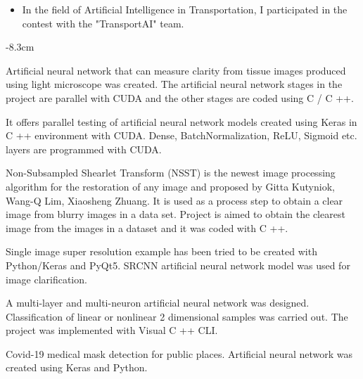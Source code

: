 \documentclass[10pt,a4paper]{altacv}
\begin{document}

\begin{itemize}
    \item In the field of Artificial Intelligence in Transportation, I participated in the contest with the "TransportAI" team.
\end{itemize}

\smallskip


\begin{adjustwidth}{}{-8.3cm}

 {}

Artificial neural network that can measure clarity from tissue images produced using light microscope was created. The artificial neural network stages in the project are parallel with CUDA and the other stages are coded using C / C ++.

\divider

It offers parallel testing of artificial neural network models created using Keras in C ++ environment with CUDA. Dense, BatchNormalization, ReLU, Sigmoid etc. layers are programmed with CUDA.

\divider


Non-Subsampled Shearlet Transform (NSST) is the newest image processing algorithm for the restoration of any image and proposed by Gitta Kutyniok, Wang-Q Lim, Xiaosheng Zhuang. It is used as a process step to obtain a clear image from blurry images in a data set. Project is aimed to obtain the clearest image from the images in a dataset and it was coded with C ++.

\divider

Single image super resolution example has been tried to be created with Python/Keras and PyQt5. SRCNN artificial neural network model was used for image clarification.

\divider

A multi-layer and multi-neuron artificial neural network was designed. Classification of linear or nonlinear 2 dimensional samples was carried out. The project was implemented with Visual C ++ CLI.

\divider

Covid-19 medical mask detection for public places. Artificial neural network  was created using Keras and Python.


\end{adjustwidth}
\end{document}
